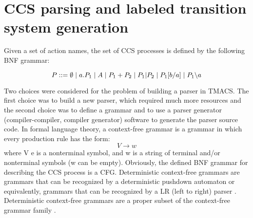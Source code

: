 \section{CCS parsing and labeled transition system generation}
\label{sec:parsing}

Given a set of action names, the set of CCS processes is defined by the following BNF grammar:

\begin{equation}\label{eq:ccs_bnf}
P ::= \emptyset \hspace{1 mm} | \hspace{1 mm} a.P_{1} \hspace{1 mm} | \hspace{1 mm} A \hspace{1 mm} | \hspace{1 mm}P_{1}+P_{2} \hspace{1 mm} |
\hspace{1 mm} P_{1} | P_{2} \hspace{1 mm} | \hspace{1 mm} P_{1}[b/a] \hspace{1 mm} | \hspace{1 mm} P_{1} \backslash a
\end{equation}

Two choices were considered for the problem of building a parser in TMACS. The first choice was to build
a new parser, which required much more resources and the second choice was to define a grammar
and to use a parser generator (compiler-compiler, compiler generator) software to generate the parser source code.
In formal language theory, a context-free grammar \cite{Chomsky} is a grammar in which every production 
rule has the form:
\[V \rightarrow w \]
where V e is a nonterminal symbol, and w is a string of terminal and/or nonterminal symbols 
(w can be empty). Obviously, the defined BNF grammar for describing the CCS process is a CFG. 
Deterministic context-free grammars \cite{Chomsky} are grammars that can be recognized by a 
deterministic pushdown automaton or equivalently, grammars that can be recognized by a LR (left to right) 
parser \cite{Compilers}. Deterministic context-free grammars are a proper subset of the context-free grammar 
family \cite{Chomsky}. %

